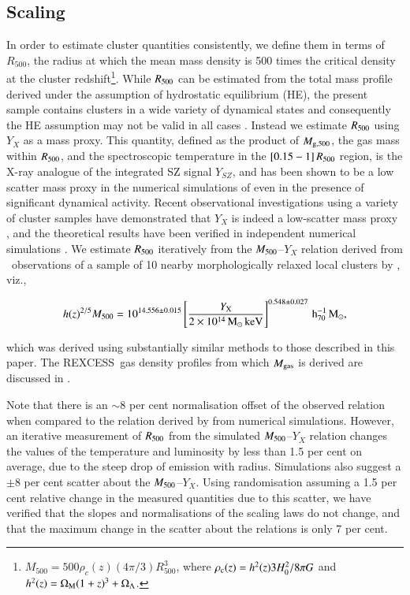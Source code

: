 \documentclass[oldversion]{aa}
\newcommand{\rexcess}{{\gwpfont REXCESS}}
\begin{document}
{\subsection{Scaling}

In order to estimate cluster quantities consistently, we define them
in terms of $R_{500}$, the radius at which the mean mass density is
500 times the critical density at the cluster
redshift\footnote{$M_{500} = 500 \rho_c (z) (4\pi/3) R_{500}^3$, where
$\rho_{\rm c}(z)= h^{2}(z) 3 H_0^2 / 8 \pi G$ and $h^{2}(z) = \Omega_{\rm
M}(1 + z)^3 + \Omega_\Lambda$.}. While $R_{500}$ can be estimated from the total mass profile
derived under the assumption of hydrostatic equilibrium (HE), the
present sample contains clusters in a wide variety of dynamical states and consequently the HE assumption may not be valid in all cases \citep[see the discussion in][]{pratt07}. Instead we estimate $R_{500}$
using $Y_X$ as a mass proxy. This quantity, defined as the product of
$M_{\rm g,500}$, the gas mass within $R_{500}$, and the
spectroscopic temperature in the $[0.15-1]\,R_{500}$ region, is the X-ray
analogue of the integrated SZ signal $Y_{SZ}$, and has been shown to
be a low scatter mass proxy in the numerical simulations of
\citet{kvn06} even in the presence of significant dynamical activity. Recent observational investigations using a variety of
cluster samples have demonstrated that $Y_X$ is indeed a low-scatter mass proxy
\citep{maughan07,app07}, and the theoretical results
have been verified in independent numerical simulations 
\citep{poole07,yang08}. We estimate $R_{500}$ iteratively from the $M_{\rm 500}$--$Y_X$
relation derived from \xmm\ observations of a sample of 10 nearby
morphologically relaxed local clusters by 
\citet{app07}, viz.,  

{\small
\begin{equation}
h(z)^{2/5}M_{\rm 500} = 10^{14.556 \pm 0.015} \left[\frac{Y_{\rm X}}{2\times10^{14}\,{{\rm M_{\odot}}}\,\rm keV}\right]^{0.548 \pm 0.027}\,{\rm h_{70}^{-1}\,{\rm M_{\odot}}},
\end{equation}
}

\noindent which was derived using substantially similar methods to those described in this paper. The \rexcess\ gas density profiles from which $M_{\rm gas}$ is derived are discussed in \citet{croston08}. 

Note that there is an $\sim 8$ per cent normalisation offset of the observed relation when compared to the relation derived by \citet{nkv07} from numerical simulations. However, an iterative measurement of $R_{500}$ from the simulated $M_{\rm 500}$--$Y_X$ relation changes the values of the temperature and luminosity by less than 1.5 per cent on average, due to the steep drop of emission with radius. Simulations also suggest a $\pm 8$ per cent scatter about the $M_{\rm 500}$--$Y_X$. Using randomisation assuming a 1.5 per cent relative change in the measured quantities due to this scatter, we have verified that the slopes and normalisations of the scaling laws do not change, and that the maximum change in the scatter about the relations is only 7 per cent.

}
\end{document}
